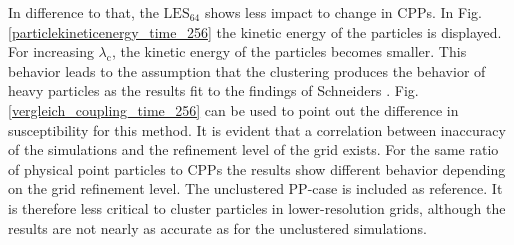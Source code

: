 \documentclass[11pt,a4paper,openany,oneside,parskip=half*]{article}
\begin{document}
In difference to that, the $\mathrm{LES_{64}}$ shows less impact to change in CPPs. 
\newline
In Fig. \ref{particlekineticenergy_time_256} the kinetic energy of the particles is displayed. For increasing $\lambda_\mathrm{c}$, the kinetic energy of the particles becomes smaller. This behavior leads to the assumption that the clustering produces the behavior of heavy particles as the results fit to the findings of Schneiders \cite{Schneiders2017}. 
\newline
Fig. \ref{vergleich_coupling_time_256} can be used to point out the difference in susceptibility for this method. It is evident that a correlation between inaccuracy of the simulations and the refinement level of the grid exists. For the same ratio of physical point particles to CPPs the results show different behavior depending on the grid refinement level. The unclustered PP-case is included as reference. It is therefore less critical to cluster particles in lower-resolution grids, although the results are not nearly as accurate as for the unclustered simulations. 
\end{document}
